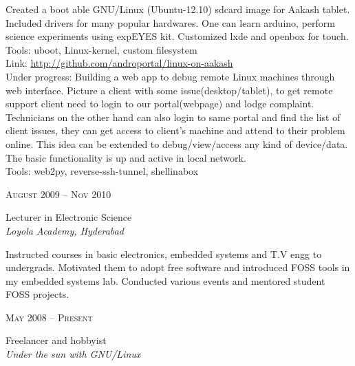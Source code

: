 \documentclass[10pt]{article} %
\begin{document}
{\begin{minipage}[t]{0.5\textwidth}
{Created a boot able GNU/Linux (Ubuntu-12.10) sdcard image for Aakash tablet. Included drivers for many popular hardwares. One can learn arduino, perform science experiments using expEYES kit. Customized lxde and openbox for touch. \\
Tools: uboot, Linux-kernel, custom filesystem\\
Link:  \href{http://github.com/androportal/linux-on-aakash}{http://github.com/androportal/linux-on-aakash}\\


Under progress: Building a web app to debug remote Linux machines through web interface. Picture a client with some issue(desktop/tablet),
 to get remote support client need to login to our portal(webpage) and lodge complaint. Technicians on the other hand can also login to same portal and find
the list of client issues, they can get access to client's machine and attend to their problem online. This idea can be extended to debug/view/access any kind of device/data. The basic functionality is up and active in local network.\\ 
Tools: web2py, reverse-ssh-tunnel, shellinabox\\

}




{\raggedleft\textsc{August 2009 -- Nov 2010}\par}

{\raggedright\large  Lecturer in Electronic Science\\
\textit{Loyola Academy, Hyderabad}\\[5pt]}

\normalsize{Instructed courses in basic electronics, embedded systems and T.V engg to undergrads. Motivated them to adopt free software and introduced FOSS tools in my embedded systems lab. Conducted various events and mentored student FOSS projects.}\\


{\raggedleft\textsc{May 2008 -- Present}\par}

{\raggedright\large  Freelancer and hobbyist\\
\textit{Under the sun with GNU/Linux}\\[5pt]}


\end{minipage}}
\end{document}
